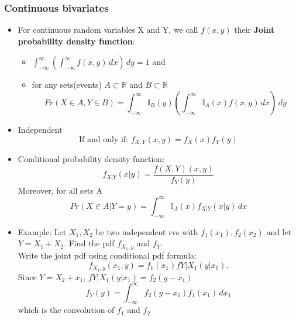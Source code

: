\documentclass[12pt]{article}
\begin{document}
\subsubsection{Continuous bivariates}
\begin{itemize}
\item For continuous random variables X and Y, we call $f(x,y)$ their \textbf{Joint probability density function}:
\begin{itemize}
\item $\int_{-\infty}^{\infty} \left( \int_{-\infty}^{\infty} f(x,y) \,dx \right) \, dy =1$  and
\item for any sets(events) $A \subset \mathbb{R}$ and  $B \subset \mathbb{R}$
$$ Pr(X \in A, Y \in B) = \int_{-\infty}^{\infty} \mathbb{I}_B(y) \left( \int_{-\infty}^{\infty} \mathbb{I}_A(x)f(x,y) \, dx \right) \, dy $$


\end{itemize}
\item Independent
$$\textrm{If and only if:   } f_{X,Y}(x,y) = f_X(x)f_Y(y)$$
\item Conditional probability density function:
$$f_{X|Y}(x|y)=\frac{f(X,Y)(x,y)}{f_Y(y)}$$
Moreover, for all sets A
$$Pr(X \in A| Y =y) = \int_{-\infty}^{\infty} \mathbb{I}_A(x)f_{X|Y}(x|y) \, dx$$
\item Example: Let $X_1, X_2$ be two independent rvs with $f_1(x_1), f_2(x_2)$ and let $Y=X_1+X_2$. Find the pdf $f_{X_1,y}$ and $f_Y$. \\

Write the joint pdf using conditional pdf formula:
$$f_{X_1,y}(x_1,y) = f_1(x_1)f{Y|X_1}(y|x_1). $$
Since $Y=X_2+x_1$, $f{Y|X_1}(y|x_1) = f_2(y-x_1)$
$$f_Y(y) = \int_{-\infty}^{\infty} f_2(y-x_1)f_1(x_1) \, dx_1$$ 
which is the convolution of $f_1$ and $f_2$ 
\end{itemize}
\end{document}
